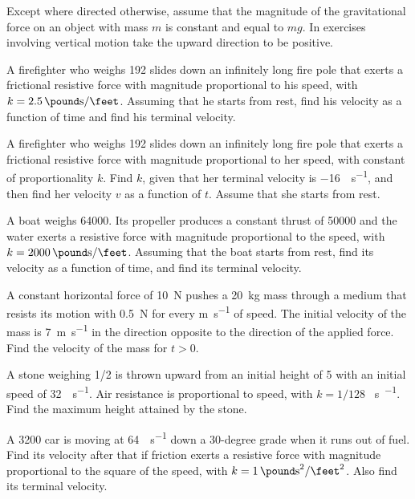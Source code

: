 \exercises
Except where directed otherwise, assume that the magnitude of the
gravitational force on an object with mass $m$ is constant and equal
to $mg$. In exercises involving vertical motion take the upward
direction to be positive.

\begin{exerciselist}

\item\label{exer:4.3.1}A firefighter  who weighs \qty{192}{\pound} slides down an infinitely long
fire pole
that exerts a frictional resistive force with magnitude proportional
to his speed, with $k=\qty{2.5}{\pound\second\per\feet}$. Assuming that he starts from
rest, find his velocity as a function of time and find his terminal
velocity.

\item\label{exer:4.3.2}A firefighter who weighs \qty{192}{\pound} slides down an infinitely long
fire pole
that exerts a frictional resistive force with magnitude proportional
to her speed, with constant of proportionality $k$. Find $k$, given
that her terminal velocity is \qty{-16}{\feet\per\second}, and then find her velocity
$v$ as a function of $t$. Assume that she starts from rest.

\item\label{exer:4.3.3}A boat weighs \qty{64000}{\pound}. Its propeller produces a constant thrust of
\qty{50000}{\pound} and the water exerts a resistive force with magnitude
proportional to the speed, with $k=\qty{2000}{\pound\second\per\feet}$. Assuming that the
boat starts from rest, find its velocity as a function of time, and
find its terminal velocity.

\item\label{exer:4.3.4}A constant horizontal force of \qty{10}{\newton} pushes a \qty{20}{\kilo\gram} mass through a
medium that resists its motion with \qty{.5}{\newton} for every \unit{\meter\per\second} of speed. The
initial velocity of the mass is \qty{7}{\meter\per\second} in the direction opposite to
the direction of the applied force. Find the velocity of the mass for
$t > 0$.

\item\label{exer:4.3.5}A stone weighing 1/2 \unit{\pound} is thrown upward from an initial height of \qty{5}{\feet} with an initial speed of \qty{32}{\feet\per\second}. Air resistance is
proportional to speed, with $k=1/128$ \unit{\pound\second\per\feet}. Find the
maximum height attained by the stone.

\item\label{exer:4.3.6}A \qty{3200}{\pound} car is moving at \qty{64}{\feet\per\second} down a 30-degree grade when it
runs out of fuel. Find its velocity after that if friction exerts a
resistive force with magnitude proportional to the square of the
speed, with $k=\qty{1}{\pound\second\squared\per\feet\squared}$. Also find its
terminal velocity.


\end{exerciselist}
